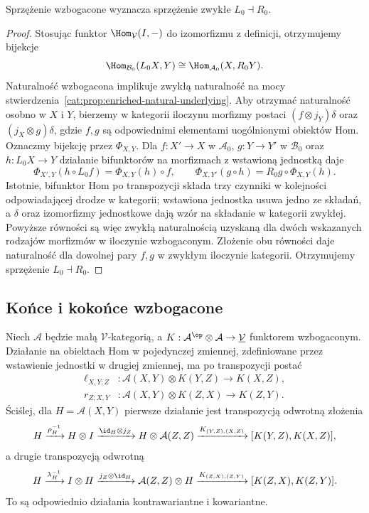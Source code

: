 \begin{stwierdzenie}\label{cat:prop:enriched-adjunction-underlying}
Sprzężenie wzbogacone wyznacza sprzężenie zwykłe $L_0\dashv R_0$.
\end{stwierdzenie}
\begin{proof}
Stosując funktor $\Hom_{\mathcal V}(I,-)$ do izomorfizmu z definicji, otrzymujemy bijekcje
\[
 \Hom_{\mathcal B_0}(L_0X,Y)\cong\Hom_{\mathcal A_0}(X,R_0Y).
\]
Naturalność wzbogacona implikuje zwykłą naturalność na mocy stwierdzenia~\ref{cat:prop:enriched-natural-underlying}. Aby otrzymać naturalność osobno w $X$ i $Y$, bierzemy w kategorii iloczynu morfizmy postaci $(f\otimes j_Y)\delta$ oraz $(j_X\otimes g)\delta$, gdzie $f,g$ są odpowiednimi elementami uogólnionymi obiektów Hom. Oznaczmy bijekcję przez $\Phi_{X,Y}$. Dla $f:X'\to X$ w $\mathcal A_0$, $g:Y\to Y'$ w $\mathcal B_0$ oraz $h:L_0X\to Y$ działanie bifunktorów na morfizmach z wstawioną jednostką daje
\[
 \Phi_{X',Y}(h\circ L_0f)=\Phi_{X,Y}(h)\circ f,\qquad
 \Phi_{X,Y'}(g\circ h)=R_0g\circ\Phi_{X,Y}(h).
\]
Istotnie, bifunktor Hom po transpozycji składa trzy czynniki w kolejności odpowiadającej drodze w kategorii; wstawiona jednostka usuwa jedno ze składań, a $\delta$ oraz izomorfizmy jednostkowe dają wzór na składanie w kategorii zwykłej. Powyższe równości są więc zwykłą naturalnością uzyskaną dla dwóch wskazanych rodzajów morfizmów w iloczynie wzbogaconym. Złożenie obu równości daje naturalność dla dowolnej pary $f,g$ w zwykłym iloczynie kategorii. Otrzymujemy sprzężenie $L_0\dashv R_0$.
\end{proof}

\subsection{Końce i kokońce wzbogacone}

Niech $\mathcal A$ będzie małą $\mathcal V$-kategorią, a $K:\mathcal A^{\op}\otimes\mathcal A\to\underline{\mathcal V}$ funktorem wzbogaconym. Działanie na obiektach Hom w pojedynczej zmiennej, zdefiniowane przez wstawienie jednostki w drugiej zmiennej, ma po transpozycji postać
\[
\begin{aligned}
 \ell_{X,Y;Z}&:\mathcal A(X,Y)\otimes K(Y,Z)\to K(X,Z),\\
 r_{Z;X,Y}&:\mathcal A(X,Y)\otimes K(Z,X)\to K(Z,Y).
\end{aligned}
\]
Ściślej, dla $H=\mathcal A(X,Y)$ pierwsze działanie jest transpozycją odwrotną złożenia
\[
 H\xrightarrow{\rho_H^{-1}}H\otimes I
 \xrightarrow{\id_H\otimes j_Z}H\otimes\mathcal A(Z,Z)
 \xrightarrow{K_{(Y,Z),(X,Z)}}[K(Y,Z),K(X,Z)],
\]
a drugie transpozycją odwrotną
\[
 H\xrightarrow{\lambda_H^{-1}}I\otimes H
 \xrightarrow{j_Z\otimes\id_H}\mathcal A(Z,Z)\otimes H
 \xrightarrow{K_{(Z,X),(Z,Y)}}[K(Z,X),K(Z,Y)].
\]
To są odpowiednio działania kontrawariantne i kowariantne.

